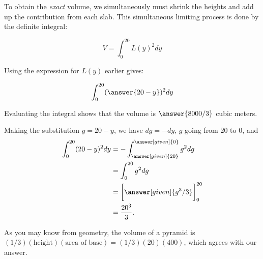 \documentclass{ximera}
\begin{document}
\begin{exercise}
To obtain the \emph{exact} volume, we simultaneously must shrink the heights and add up the contribution from each slab.  This simultaneous limiting process is done by the definite integral:

\[
V = \int_{0}^{20} L(y)^2 dy
\]

Using the expression for $L(y)$ earlier gives:

\[
\int_0^{20} (\answer{20-y})^2 dy
\]

Evaluating the integral shows that the volume is $\answer{8000/3}$ cubic meters.

\begin{hint}

Making the substitution $g = 20-y $, we have $dg = - dy$, $g$ going from $20$ to $0$, and 
	\begin{align*}
	\int_0^{20} (20-y)^2 dy &= -\int_{\answer[given]{20}}^{\answer[given]{0}} g^2 dg\\
		&= \int_0^{20} g^2 dg\\
		&= \bigg[\answer[given]{g^3/3}\bigg]_0^{20}\\
		&= \frac{20^3}{3}.
	\end{align*}

\end{hint}

As you may know from geometry, the volume of a pyramid is
$(1/3)(\text{height})(\text{area of base})=(1/3)(20)(400)$, which
agrees with our answer.


\end{exercise}
\end{document}
